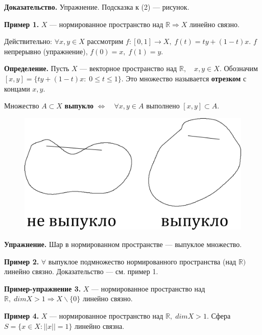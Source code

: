 \documentclass[12pt,a4paper]{article}
\begin{document}
\textbf{Доказательство.} Упражнение. Подсказка к (2) --- рисунок.

\textbf{Пример 1.} $X$ --- нормированное пространство над $\mathbb{R} \Rightarrow X$ линейно связно. 

Действительно: $\forall x, y \in X$ рассмотрим $f: [0, 1] \to X, \; f(t) = ty + (1 - t)x.$ $f$ непрерывно (упражнение), $f(0) = x, \; f(1) = y.$

\textbf{Определение.} Пусть $X$ --- векторное пространство над $\mathbb{R}, \quad x, y \in X.$ Обозначим $[x, y] = \{ty + (1 - t)x: \; 0 \leq t  \leq 1\}.$ Это множество называется \textbf{отрезком} с концами $x, y.$ 

Множество $A \subset X$ \textbf{выпукло} $\Leftrightarrow \quad \forall x, y \in A$ выполнено $[x, y] \subset A.$ 

\begin{figure}
	\includegraphics[width=0.8\linewidth]{lect8_6.png}
\end{figure}

\textbf{Упражнение.} Шар в нормированном пространстве --- выпуклое множество. 

\textbf{Пример 2.} $\forall$ выпуклое подмножество нормированного пространства (над $\mathbb{R})$ линейно связно. Доказательство --- см. пример 1. 

\textbf{Пример-упражнение 3.} $X$ --- нормированное пространство над $\mathbb{R}, \; dim X > 1 \Rightarrow X \backslash \{0\}$ линейно связно. 

\textbf{Пример 4.} $X$ --- нормированное пространство над $\mathbb{R}, \; dim X > 1.$ Сфера $S = \{x \in X: ||x|| =  1\}$ линейно связна. 
\end{document}
